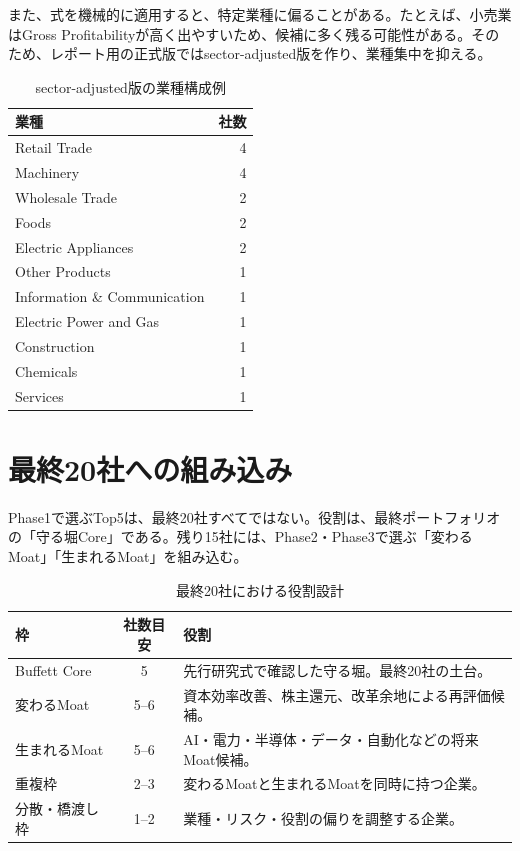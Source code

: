 \documentclass[11pt,a4paper]{article}
\begin{document}
また、式を機械的に適用すると、特定業種に偏ることがある。たとえば、小売業はGross Profitabilityが高く出やすいため、候補に多く残る可能性がある。そのため、レポート用の正式版ではsector-adjusted版を作り、業種集中を抑える。

\begin{table}[tbp]
\caption{sector-adjusted版の業種構成例}
\label{tab:sector-example}
\centering
\small
\begin{tabular}{lr}
\toprule
業種 & 社数 \\
\midrule
Retail Trade & 4 \\
Machinery & 4 \\
Wholesale Trade & 2 \\
Foods & 2 \\
Electric Appliances & 2 \\
Other Products & 1 \\
Information \& Communication & 1 \\
Electric Power and Gas & 1 \\
Construction & 1 \\
Chemicals & 1 \\
Services & 1 \\
\bottomrule
\end{tabular}
\end{table}

\clearpage
\section{最終20社への組み込み}

Phase1で選ぶTop5は、最終20社すべてではない。役割は、最終ポートフォリオの「守る堀Core」である。残り15社には、Phase2・Phase3で選ぶ「変わるMoat」「生まれるMoat」を組み込む。

\begin{table}[tbp]
\caption{最終20社における役割設計}
\label{tab:final20-structure}
\centering
\small
\begin{tabularx}{\linewidth}{p{35mm}cY}
\toprule
枠 & 社数目安 & 役割 \\
\midrule
Buffett Core & 5 & 先行研究式で確認した守る堀。最終20社の土台。 \\
変わるMoat & 5--6 & 資本効率改善、株主還元、改革余地による再評価候補。 \\
生まれるMoat & 5--6 & AI・電力・半導体・データ・自動化などの将来Moat候補。 \\
重複枠 & 2--3 & 変わるMoatと生まれるMoatを同時に持つ企業。 \\
分散・橋渡し枠 & 1--2 & 業種・リスク・役割の偏りを調整する企業。 \\
\bottomrule
\end{tabularx}
\end{table}
\end{document}
